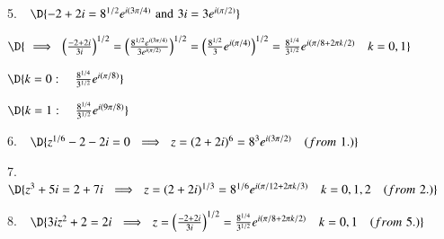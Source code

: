 \documentclass[11pt]{article}
\begin{document}
5. \,\, $\D{-2+2i = 8^{1/2}e^{i(3\pi/4)} \,\, \text{and} \,\, 3i = 3e^{i(\pi/2)} }$

$\D{ \,\, \implies \,\, \left(\frac{-2+2i}{3i}\right)^{1/2} = \left(\frac{8^{1/2}e^{i(3\pi/4)}}{3e^{i(\pi/2)}}\right)^{1/2} = \left(\frac{8^{1/2}}{3}e^{i(\pi/4)}\right)^{1/2} = \frac{8^{1/4}}{3^{1/2}}e^{i(\pi/8+2\pi k/2)} \quad k=0,1}$ 

\vspace{0.1cm}

\hspace{1.0cm} $\D{k=0: \quad \frac{8^{1/4}}{3^{1/2}}e^{i(\pi/8)}}$

\hspace{1.0cm} $\D{k=1: \quad \frac{8^{1/4}}{3^{1/2}}e^{i(9\pi/8)}}$

\vspace{0.2cm}

6. \,\, $\D{z^{1/6}-2-2i = 0 \,\, \implies \,\, z = (2+2i)^6 = 8^{3}e^{i(3\pi/2)} \quad (from \,\, 1.)}$

\vspace{0.2cm}

7. \,\, $\D{z^3 + 5i = 2+7i \,\, \implies \,\, z = (2+2i)^{1/3} = 8^{1/6}e^{i(\pi/12+2\pi k/3)} \quad k=0,1,2 \quad (from \,\, 2.)}$

\vspace{0.2cm}

8. \,\, $\D{3iz^2 + 2 = 2i \,\, \implies \,\, z = \left(\frac{-2+2i}{3i}\right)^{1/2} = \frac{8^{1/4}}{3^{1/2}}e^{i(\pi/8+2\pi k/2)} \quad k=0,1 \quad (from \,\, 5.)}$
\end{document}

